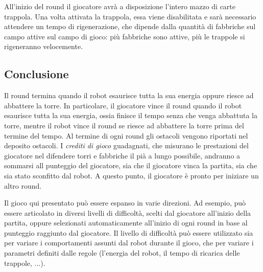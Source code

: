 All'inizio del round il giocatore avrà a disposizione l'intero mazzo di carte trappola. Una volta attivata la trappola, essa viene disabilitata e sarà necessario attendere un tempo di rigenerazione, che dipende dalla quantità di fabbriche sul campo attive sul campo di gioco: più fabbriche sono attive, più le trappole si rigeneranno velocemente.

	\subsection*{Conclusione} 
Il round termina quando il robot esaurisce tutta la sua energia oppure riesce ad abbattere la torre. In particolare, il giocatore vince il round quando il robot esaurisce tutta la sua energia, ossia finisce il tempo senza che venga abbattuta la torre, mentre il robot vince il round se riesce ad abbattere la torre prima del termine del tempo.
Al termine di ogni round gli ostacoli vengono riportati nel deposito ostacoli.
I \emph{crediti di gioco} guadagnati, che misurano le prestazioni del giocatore nel difendere torri e fabbriche il pià a lungo possibile, andranno a sommarsi all punteggio del giocatore, sia che il giocatore vinca la partita, sia che sia stato sconfitto dal robot.
A questo punto, il giocatore è pronto per iniziare un altro round.

\begin{nota}
Il gioco qui presentato può essere espanso in varie direzioni. Ad esempio, può essere articolato in diversi livelli di difficoltà, scelti dal giocatore all'inizio della partita, oppure selezionati automaticamente all'inizio di ogni round in base al punteggio raggiunto dal giocatore. Il livello di difficoltà può essere utilizzato sia per variare i comportamenti assunti dal robot durante il gioco, che per variare i parametri definiti dalle regole (l'energia del robot, il tempo di ricarica delle trappole, ...).
\end{nota}


